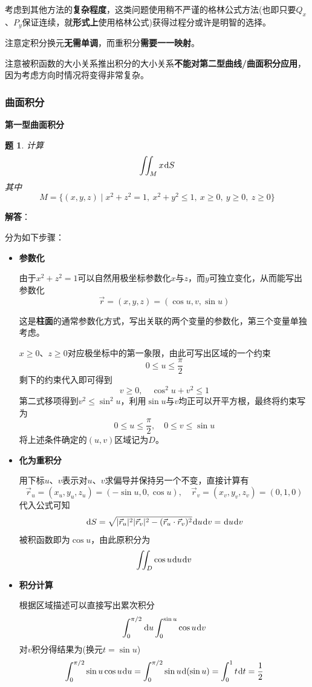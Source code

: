 \documentclass[a4paper,UTF8,fontset=windows,AutoFakeBold]{ctexart}
\newcommand*{\dr}{\hspace{0.07em}\mathrm{d}}
\newcommand*{\rv}{\vec{r}}
\newcommand*{\note}{\noindent *}
\theoremstyle{ex}
\newtheorem{exercise}{题}
\newcommand{\sol}[1]{{\vspace{5pt}\kaishu\noindent\textbf{解答}：\vspace{-3pt}
\begin{compactitem}
    \item[] #1
\end{compactitem}
}}
\begin{document}
\begin{framed}
{    \note 考虑到其他方法的\textbf{复杂程度}，这类问题使用稍不严谨的格林公式方法(也即只要$Q_x$、$P_y$保证连续，就\textbf{形式上}使用格林公式)获得过程分或许是明智的选择。
}
\end{framed}

\note 注意定积分换元\textbf{无需单调}，而重积分\textbf{需要一一映射}。

\note 注意被积函数的大小关系推出积分的大小关系\textbf{不能对第二型曲线/曲面积分应用}，因为考虑方向时情况将变得非常复杂。

\subsubsection{曲面积分}
\noindent\textbf{第一型曲面积分}
\begin{framed}
\begin{exercise}
    计算
    $$\iint_Mx\dr S$$
    其中
    $$M=\{(x,y,z)\mid x^2+z^2=1,\ x^2+y^2\le1,\ x\ge0,\ y\ge0,\ z\ge0\}$$
\end{exercise}
\sol{
    分为如下步骤：
    \begin{itemize}
        \item \textbf{参数化}
        
        由于$x^2+z^2=1$可以自然用极坐标参数化$x$与$z$，而$y$可独立变化，从而能写出参数化
        $$\rv=(x,y,z)=(\cos u,v,\sin u)$$

        \note 这是\textbf{柱面}的通常参数化方式，写出关联的两个变量的参数化，第三个变量单独考虑。

        $x\ge0$、$z\ge0$对应极坐标中的第一象限，由此可写出区域的一个约束
        $$0\le u\le\frac{\pi}{2}$$
        剩下的约束代入即可得到
        $$v\ge0,\quad\cos^2u+v^2\le1$$
        第二式移项得到$v^2\le\sin^2u$，利用$\sin u$与$v$均正可以开平方根，最终将约束写为
        $$0\le u\le\frac{\pi}{2},\quad 0\le v\le\sin u$$
        将上述条件确定的$(u,v)$区域记为$D$。

        \item \textbf{化为重积分}
        
        用下标$u$、$v$表示对$u$、$v$求偏导并保持另一个不变，直接计算有
        $$\rv_u=(x_u,y_u,z_u)=(-\sin u,0,\cos u),\quad\rv_v=(x_v,y_v,z_v)=(0,1,0)$$
        代入公式可知
        $$\dr S=\sqrt{|\rv_u|^2|\rv_v|^2-(\rv_u\cdot\rv_v)^2}\dr u\dr v=\dr u\dr v$$
        被积函数即为$\cos u$，由此原积分为
        $$\iint_D\cos u\dr u\dr v$$

        \item \textbf{积分计算}
        
        根据区域描述可以直接写出累次积分
        $$\int_0^{\pi/2}\dr u\int_0^{\sin u}\cos u\dr v$$
        对$v$积分得结果为(换元$t=\sin u$)
        $$\int_0^{\pi/2}\sin u\cos u\dr u=\int_0^{\pi/2}\sin u\dr(\sin u)=\int_0^1t\dr t=\frac{1}{2}$$
    \end{itemize}
}
\end{framed}
\end{document}
